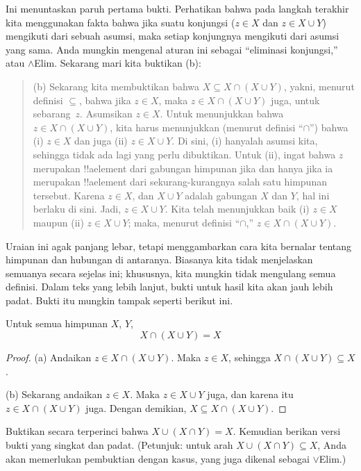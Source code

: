 \documentclass[../../../include/open-logic-section]{subfiles}
\begin{document}
\begin{explain}
Ini menuntaskan paruh pertama bukti. Perhatikan bahwa pada langkah terakhir
kita menggunakan fakta bahwa jika suatu konjungsi ($z \in X$ dan $z \in X
\cup Y$) mengikuti dari sebuah asumsi, maka setiap konjungnya mengikuti
dari asumsi yang sama. Anda mungkin mengenal aturan ini sebagai
``eliminasi konjungsi,'' atau $\land$Elim. Sekarang mari kita buktikan (b):

\begin{quote}
(b) Sekarang kita membuktikan bahwa $X \subseteq X \cap (X \cup Y)$,
yakni, menurut definisi $\subseteq$, bahwa jika $z \in X$, maka $z \in X
\cap (X \cup Y)$ juga, untuk sebarang~$z$. Asumsikan $z \in X$. Untuk
menunjukkan bahwa $z \in X \cap (X \cup Y)$, kita harus menunjukkan
(menurut definisi ``$\cap$'') bahwa (i) $z \in X$ dan juga (ii) $z \in X
\cup Y$. Di sini, (i) hanyalah asumsi kita, sehingga tidak ada lagi yang
perlu dibuktikan. Untuk (ii), ingat bahwa $z$ merupakan !!a{element} dari
gabungan himpunan jika dan hanya jika ia merupakan !!a{element} dari
sekurang-kurangnya salah satu himpunan tersebut. Karena $z \in X$, dan $X
\cup Y$ adalah gabungan $X$ dan $Y$, hal ini berlaku di sini. Jadi, $z \in
X \cup Y$. Kita telah menunjukkan baik (i) $z \in X$ maupun (ii) $z \in X
\cup Y$; maka, menurut definisi ``$\cap$,'' $z \in X \cap (X \cup Y)$.
\end{quote}

Uraian ini agak panjang lebar, tetapi menggambarkan cara kita bernalar
tentang himpunan dan hubungan di antaranya. Biasanya kita tidak menjelaskan
semuanya secara sejelas ini; khususnya, kita mungkin tidak mengulang semua
definisi. Dalam teks yang lebih lanjut, bukti untuk hasil kita akan jauh
lebih padat. Bukti itu mungkin tampak seperti berikut ini.
\end{explain}


\begin{prop}[Absorpsi]
Untuk semua himpunan $X$, $Y$,
\[
X \cap (X \cup Y) = X
\]
\end{prop}

\begin{proof}
(a) Andaikan $z \in X \cap (X \cup Y)$. Maka $z \in X$, sehingga $X \cap
(X \cup Y) \subseteq X$.

(b) Sekarang andaikan $z \in X$. Maka $z \in X \cup Y$ juga, dan karena
itu $z \in X \cap (X \cup Y)$ juga. Dengan demikian, $X \subseteq X \cap
(X \cup Y)$.
\end{proof}

\begin{prob}
Buktikan secara terperinci bahwa $X \cup (X \cap Y) = X$. Kemudian berikan
versi bukti yang singkat dan padat. (Petunjuk: untuk arah $X \cup (X \cap Y)
\subseteq X$, Anda akan memerlukan pembuktian dengan kasus, yang juga
dikenal sebagai $\lor$Elim.)
\end{prob}
\end{document}
